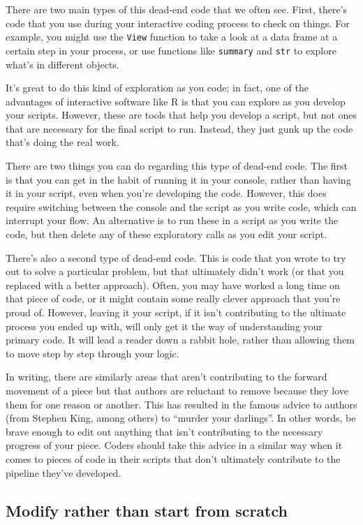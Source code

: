 \documentclass[]{tufte-book}
\begin{document}
There are two main types of this dead-end code that we often see. First, there's
code that you use during your interactive coding process to check on things. For
example, you might use the \texttt{View} function to take a look at a data frame at a
certain step in your process, or use functions like \texttt{summary} and \texttt{str} to
explore what's in different objects.

It's great to do this kind of exploration as you code; in fact, one of the
advantages of interactive software like R is that you can explore as you
develop your scripts. However, these are tools that help you develop a script,
but not ones that are necessary for the final script to run. Instead, they just
gunk up the code that's doing the real work.

There are two things you can do regarding this type of dead-end code. The first
is that you can get in the habit of running it in your console, rather than
having it in your script, even when you're developing the code. However, this
does require switching between the console and the script as you write code,
which can interrupt your flow. An alternative is to run these in a script as
you write the code, but then delete any of these exploratory calls as you
edit your script.

There's also a second type of dead-end code. This is code that you wrote to try
out to solve a particular problem, but that ultimately didn't work (or that
you replaced with a better approach). Often, you may have worked a long time
on that piece of code, or it might contain some really clever approach that
you're proud of. However, leaving it your script, if it isn't contributing to
the ultimate process you ended up with, will only get it the way of understanding
your primary code. It will lead a reader down a rabbit hole, rather than allowing
them to move step by step through your logic.

In writing, there are similarly areas that aren't contributing to the forward
movement of a piece but that authors are reluctant to remove because they love
them for one reason or another. This has resulted in the famous advice to
authors (from Stephen King, among others) to ``murder your darlings''. In other
words, be brave enough to edit out anything that isn't contributing to the
necessary progress of your piece. Coders should take this advice in a similar
way when it comes to pieces of code in their scripts that don't ultimately
contribute to the pipeline they've developed.

\subsection{Modify rather than start from scratch}\label{modify-rather-than-start-from-scratch}
\end{document}
